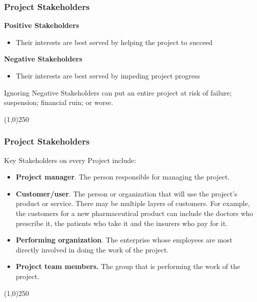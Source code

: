 \begin{frame}
\frametitle{Project Stakeholders}
\textbf{Positive Stakeholders}\\
\begin{itemize}
	\item Their interests are best served by helping the project to succeed
\end{itemize}
\textbf{Negative Stakeholders}\\
\begin{itemize}
	\item Their interests are best served by impeding project progress
\end{itemize}
Ignoring Negative Stakeholders can put an entire project at risk of failure; suspension; financial ruin; or worse.\\
\end{frame}
\begin{center}\line(1,0){250}\end{center}



\begin{frame}
\frametitle{Project Stakeholders}
Key Stakeholders on every Project include:\\
\begin{itemize}
	\item \textbf{Project manager}. The person responsible for managing the project. 
	\item \textbf{Customer/user}. The person or organization that will use the project's product or service. There may be multiple layers of customers. For example, the customers for a new pharmaceutical product can include the doctors who prescribe it, the patients who take it and the insurers who pay for it.
	\item \textbf{Performing organization}. The enterprise whose employees are most directly involved in doing the work of the project. 
	\item \textbf{Project team members.} The group that is performing the work of the project. 
\end{itemize}
\end{frame}
\begin{center}\line(1,0){250}\end{center}



